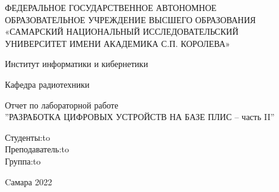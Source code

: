 \begin{titlepage}
\newpage
\doublespacing
\begin{center}
ФЕДЕРАЛЬНОЕ ГОСУДАРСТВЕННОЕ АВТОНОМНОЕ\\
ОБРАЗОВАТЕЛЬНОЕ УЧРЕЖДЕНИЕ ВЫСШЕГО ОБРАЗОВАНИЯ\\
«САМАРСКИЙ НАЦИОНАЛЬНЫЙ ИССЛЕДОВАТЕЛЬСКИЙ\\
УНИВЕРСИТЕТ ИМЕНИ АКАДЕМИКА С.П. КОРОЛЕВА»	
 \\
\end{center}

\vspace{5em}

\begin{center}
 Институт информатики и кибернетики \\ 
\end{center}

\begin{center}
Кафедра радиотехники \\ 
\end{center}


\vspace{3em}

\begin{center}
{Отчет по лабораторной работе\\''РАЗРАБОТКА ЦИФРОВЫХ УСТРОЙСТВ НА БАЗЕ ПЛИС -- часть II''}
\end{center}

\vspace{14em}


\newbox{\lbox}
\newlength{\maxl}
\setlength{\maxl}{\wd\lbox}
\hfill\parbox{10cm}{
\hspace*{6cm}\hspace*{-6cm}Студенты:\hfill\hbox to\\
\hspace*{4cm}\hspace*{-4cm}Преподаватель:\hfill\hbox to\\
\hspace*{4cm}\hspace*{-4cm}Группа:\hfill\hbox to\\
}



\vspace{\fill}

\begin{center}
Cамара 2022
\end{center}

\end{titlepage}